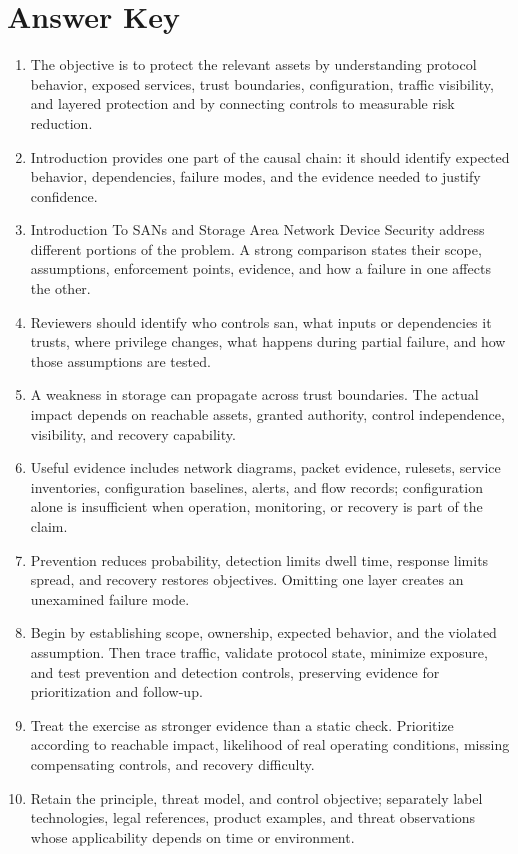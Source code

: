 \documentclass[11pt]{article}
\begin{document}
\section*{Answer Key}
\begin{enumerate}
\item The objective is to protect the relevant assets by understanding protocol behavior, exposed services, trust boundaries, configuration, traffic visibility, and layered protection and by connecting controls to measurable risk reduction.
\item Introduction provides one part of the causal chain: it should identify expected behavior, dependencies, failure modes, and the evidence needed to justify confidence.
\item Introduction To SANs and Storage Area Network Device Security address different portions of the problem. A strong comparison states their scope, assumptions, enforcement points, evidence, and how a failure in one affects the other.
\item Reviewers should identify who controls san, what inputs or dependencies it trusts, where privilege changes, what happens during partial failure, and how those assumptions are tested.
\item A weakness in storage can propagate across trust boundaries. The actual impact depends on reachable assets, granted authority, control independence, visibility, and recovery capability.
\item Useful evidence includes network diagrams, packet evidence, rulesets, service inventories, configuration baselines, alerts, and flow records; configuration alone is insufficient when operation, monitoring, or recovery is part of the claim.
\item Prevention reduces probability, detection limits dwell time, response limits spread, and recovery restores objectives. Omitting one layer creates an unexamined failure mode.
\item Begin by establishing scope, ownership, expected behavior, and the violated assumption. Then trace traffic, validate protocol state, minimize exposure, and test prevention and detection controls, preserving evidence for prioritization and follow-up.
\item Treat the exercise as stronger evidence than a static check. Prioritize according to reachable impact, likelihood of real operating conditions, missing compensating controls, and recovery difficulty.
\item Retain the principle, threat model, and control objective; separately label technologies, legal references, product examples, and threat observations whose applicability depends on time or environment.
\end{enumerate}
\end{document}
